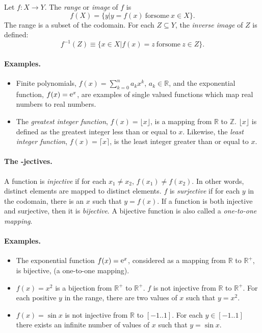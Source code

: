 Let $f: X \to Y$.  The \textit{range} or \textit{image} of $f$ is
\[
f(X) = \{ y | y = f(x)\ \mathrm{for some}\ x \in X \}.
\]
The range is a subset of the codomain.  For each $Z \subseteq Y$, the 
\textit{inverse image} of $Z$ is defined:
\[
f^{-1}(Z) \equiv \{ x \in X | f(x) = z\ \mathrm{for some}\ z \in Z \}.
\]

\paragraph{Examples.}
\begin{itemize}
\item
Finite polynomials, $f(x) = \sum_{k = 0}^n a_k x^k$, $a_k \in \mathbb{R}$, and the 
exponential function, $f(x) = \mathop{\mathrm{e}}\nolimits^x$, are examples of single 
valued functions which map real numbers to real numbers.
\item
The \textit{greatest integer function}, $f(x) = \lfloor x\rfloor$, is a mapping from 
$\mathbb{R}$ to $\mathbb{Z}$.  $\lfloor x \rfloor$ is defined as the greatest integer less 
than or equal to $x$.  Likewise, the \textit{least integer function}, 
$f(x) = \lceil x \rceil$, is the least integer greater than or equal to $x$.
\end{itemize}



\paragraph{The -jectives.}
A function is \textit{injective} if for each $x_1 \neq x_2$, 
$f(x_1) \neq f(x_2)$.
In other words, distinct elements are mapped to distinct elements.
$f$ is \textit{surjective} if for each $y$ in the codomain,
there is an $x$ such that $y = f(x)$.  If a function is both injective and 
surjective, then it is \textit{bijective}.  A bijective function is also 
called a \textit{one-to-one mapping}.


\paragraph{Examples.}
\begin{itemize}
\item
The exponential function $f(x) = \mathop{\mathrm{e}}\nolimits^x$, considered as a mapping from
$\mathbb{R}$ to $\mathbb{R}^+$, is bijective, (a one-to-one mapping).
\item
$f(x)=x^2$ is a bijection from $\mathbb{R}^+$ to $\mathbb{R}^+$.  
$f$ is not injective from $\mathbb{R}$ to $\mathbb{R}^+$.  For each positive
$y$ in the range, there are two values of $x$ such that $y=x^2$.
\item
$f(x) = \sin x$ is not injective from $\mathbb{R}$ to $[-1..1]$.  
For each $y \in [-1..1]$ there exists an infinite number of values of 
$x$ such that $y = \sin x$.
\end{itemize}


